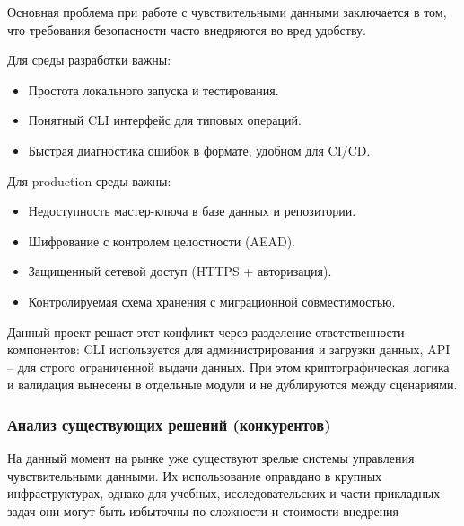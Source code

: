 \documentclass[14pt, a4paper]{extarticle}
\begin{document}
	Основная проблема при работе с чувствительными данными заключается в том, что требования безопасности часто внедряются во вред удобству.
	
	Для среды разработки важны:
	
	\begin{itemize}
	\item Простота локального запуска и тестирования.
	\item Понятный CLI интерфейс для типовых операций.
	\item Быстрая диагностика ошибок в формате, удобном для CI/CD.
	\end{itemize}
	
	Для production-среды важны:
	
	\begin{itemize}
	\item Недоступность мастер-ключа в базе данных и репозитории.
	\item Шифрование с контролем целостности (AEAD).
	\item Защищенный сетевой доступ (HTTPS + авторизация).
	\item Контролируемая схема хранения с миграционной совместимостью.
	\end{itemize}
	
	Данный проект решает этот конфликт через разделение ответственности компонентов: CLI используется для администрирования и загрузки данных, API -- для строго ограниченной выдачи данных. При этом криптографическая логика и валидация вынесены в отдельные модули и не дублируются между сценариями.
	
	\subsubsection{Анализ существующих решений (конкурентов)}
	
	На данный момент на рынке уже существуют зрелые системы управления чувствительными данными. Их использование оправдано в крупных инфраструктурах, однако для учебных, исследовательских и части прикладных задач они могут быть избыточны по сложности и стоимости внедрения
	
\end{document}
